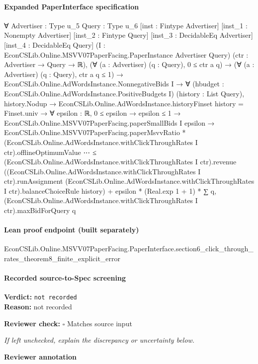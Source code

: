 \documentclass[10pt]{article}
\newcommand{\reviewerbox}{%
  \par\noindent\fbox{\parbox{0.96\linewidth}{\rule{0pt}{0.38in}}}\par
}
\newcommand{\reviewmatch}[1]{%
  \par\noindent\textbf{Reviewer check:} $\square$\; #1\par
  \noindent\emph{If left unchecked, explain the discrepancy or uncertainty below.}\par
}
\begin{document}
\paragraph{Expanded PaperInterface specification}
\begin{ReviewVerbatim}
∀ {Advertiser : Type u_5} {Query : Type u_6} [inst : Fintype Advertiser] [inst_1 : Nonempty Advertiser]
  [inst_2 : Fintype Query] [inst_3 : DecidableEq Advertiser] [inst_4 : DecidableEq Query]
  (I : EconCSLib.Online.MSVV07PaperFacing.PaperInstance Advertiser Query) (ctr : Advertiser → Query → ℝ),
  (∀ (a : Advertiser) (q : Query), 0 ≤ ctr a q) →
    (∀ (a : Advertiser) (q : Query), ctr a q ≤ 1) →
      EconCSLib.Online.AdWordsInstance.NonnegativeBids I →
        ∀ (hbudget : EconCSLib.Online.AdWordsInstance.PositiveBudgets I) (history : List Query),
          history.Nodup →
            EconCSLib.Online.AdWordsInstance.historyFinset history = Finset.univ →
              ∀ {epsilon : ℝ},
                0 ≤ epsilon →
                  epsilon ≤ 1 →
                    EconCSLib.Online.MSVV07PaperFacing.paperSmallBids I epsilon →
                      EconCSLib.Online.MSVV07PaperFacing.paperMsvvRatio *
                          (EconCSLib.Online.AdWordsInstance.withClickThroughRates I ctr).offlineOptimumValue ⋯ ≤
                        (EconCSLib.Online.AdWordsInstance.withClickThroughRates I ctr).revenue
                            ((EconCSLib.Online.AdWordsInstance.withClickThroughRates I ctr).runAssignment
                              (EconCSLib.Online.AdWordsInstance.withClickThroughRates I ctr).balanceChoiceRule
                              history) +
                          epsilon * (Real.exp 1 + 1) *
                            ∑ q, (EconCSLib.Online.AdWordsInstance.withClickThroughRates I ctr).maxBidForQuery q
\end{ReviewVerbatim}

\paragraph{Lean proof endpoint (built separately)}\begin{ReviewVerbatim}
EconCSLib.Online.MSVV07PaperFacing.PaperInterface.section6_click_through_rates_theorem8_finite_explicit_error
\end{ReviewVerbatim}

\paragraph{Recorded source-to-Spec screening}
\textbf{Verdict:} \texttt{not recorded}
\\
\textbf{Reason:} not recorded
\reviewmatch{Matches source input}
\noindent\textbf{Reviewer annotation}\par
\reviewerbox
\clearpage
\hypertarget{source-claim-c25fc3a95d0627bc}{}
\end{document}
